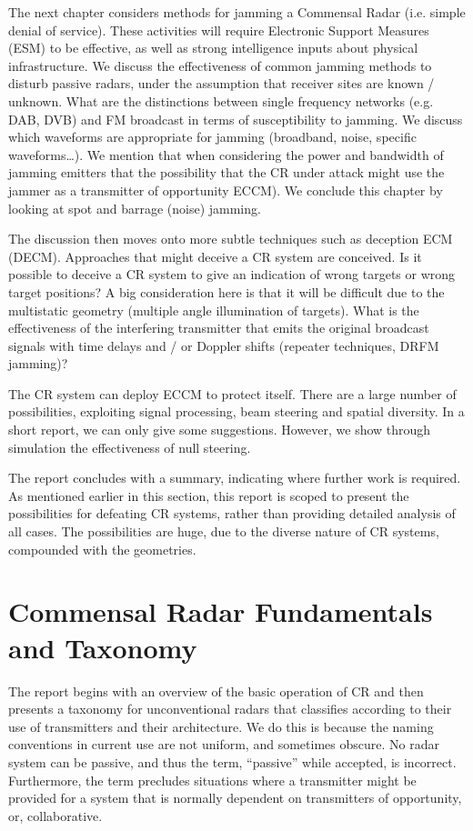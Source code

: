 \documentclass[english, 12pt]{report}
\begin{document}
The next chapter considers methods for jamming a Commensal Radar (i.e. simple denial of service). These activities  will require Electronic Support Measures (ESM) to be effective, as well as strong intelligence inputs about physical infrastructure. We discuss the effectiveness of common jamming methods to disturb passive radars, under the assumption that receiver sites are known / unknown. What are the distinctions between single frequency networks (e.g. DAB, DVB) and FM broadcast in terms of susceptibility to jamming. We discuss which waveforms are appropriate for jamming (broadband, noise, specific waveforms\ldots). We mention that when considering the power and bandwidth of jamming emitters that the possibility that the CR under attack might use the jammer as a transmitter of opportunity ECCM). We conclude this chapter by looking at spot and barrage (noise) jamming.

The discussion  then moves onto more subtle techniques such as deception ECM (DECM). Approaches that might deceive a CR system are conceived. Is it possible to deceive a CR system to give an indication of wrong targets or wrong target positions?  A big consideration here is that it will be difficult due to the multistatic geometry (multiple angle illumination of targets). What is the effectiveness of the interfering transmitter that emits the original broadcast signals with time delays and / or Doppler shifts (repeater techniques, DRFM jamming)?

The CR system can deploy ECCM to protect itself. There are a large number of possibilities, exploiting signal processing, beam steering and spatial diversity. In a short report, we can only give some suggestions. However, we show through simulation the effectiveness of null steering.

 The report concludes with a summary, indicating where further work is required. As mentioned earlier in this section, this report is scoped to present the possibilities for defeating CR systems, rather than providing detailed analysis of all cases. The possibilities are huge, due to the diverse nature of CR systems, compounded with the geometries.


\chapter{Commensal Radar Fundamentals and Taxonomy}

The report begins with an overview of the basic operation of CR and then presents a taxonomy for unconventional radars that classifies according to their use of transmitters and their architecture. We do this is because the naming conventions in current use are not uniform, and sometimes obscure. No radar system can be passive, and thus the term, ``passive'' while accepted, is incorrect. Furthermore, the term precludes situations where a transmitter might be provided for a system that is normally dependent on transmitters of opportunity, or, collaborative.
\end{document}
